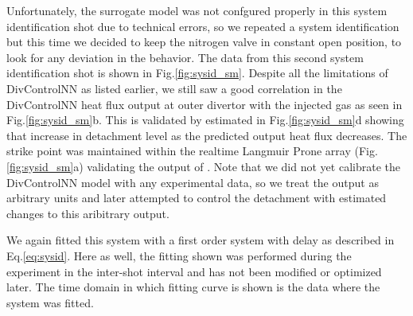 Unfortunately, the surrogate model was not confgured properly in this system identification shot due to technical errors, so we repeated a system identification but this time we decided to keep the nitrogen valve in constant open position, to look for any deviation in the behavior. The data from this second system identification shot is shown in Fig.\ref{fig:sysid_sm}. Despite all the limitations of DivControlNN as listed earlier, we still saw a good correlation in the DivControlNN heat flux output at outer divertor with the injected gas as seen in Fig.\ref{fig:sysid_sm}b. This is validated by estimated \Afrac in Fig.\ref{fig:sysid_sm}d showing that increase in detachment level as the predicted output heat flux decreases. The strike point was maintained within the realtime Langmuir Prone array (Fig.\ref{fig:sysid_sm}a) validating the output of \Afrac. Note that we did not yet calibrate the DivControlNN model with any experimental data, so we treat the output as arbitrary units and later attempted to control the detachment with estimated changes to this aribitrary output.

We again fitted this system with a first order system with delay as described in Eq.\ref{eq:sysid}. Here as well, the fitting shown was performed during the experiment in the inter-shot interval and has not been modified or optimized later. The time domain in which fitting curve is shown is the data where the system was fitted. 